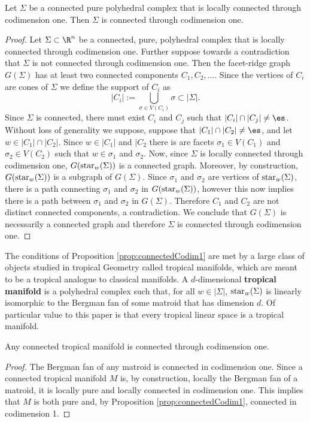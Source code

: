 \begin{proposition}\label{prop:connectedCodim1}
Let $\Sigma$ be a connected pure polyhedral complex that is locally connected through codimension one. Then $\Sigma$ is connected through codimension one.
\end{proposition}
\begin{proof}
    Let $\Sigma\subset \R^n$ be a connected, pure, polyhedral complex that is locally connected through codimension one. Further suppose towards a contradiction that $\Sigma$ is not connected through codimension one. Then the facet-ridge graph $G(\Sigma)$ has at least two connected components $C_1, C_2,\dots$. Since the vertices of $C_i$ are cones of $\Sigma$ we define the support of $C_i$ as
    $$|C_i|:= \bigcup_{\sigma\in V(C_i)} \sigma\subset |\Sigma|.$$
    Since $\Sigma$ is connected, there must exist $C_i$ and $C_j$ such that $|C_i|\cap |C_j|\neq \es$. Without loss of generality we suppose, suppose that $|C_1|\cap |C_2|\neq \es$, and let $w\in |C_1|\cap |C_2|$. Since $w\in |C_1|$ and $|C_2$ there is are facets  $\sigma_1\in V(C_1)$ and $\sigma_2\in V(C_2)$ such that $w\in \sigma_1$ and $\sigma_2$. Now, since $\Sigma$ is locally connected through codimension one, $G(\operatorname{star}_w(\Sigma))$ is a connected graph. Moreover, by construction, $G(\operatorname{star}_w(\Sigma))$ is a subgraph of $G(\Sigma)$. Since $\sigma_1$ and $\sigma_2$ are vertices of $\operatorname{star}_w(\Sigma)$, there is a path connecting $\sigma_1$ and $\sigma_2$ in $G(\operatorname{star}_w(\Sigma))$, however this now implies there is a path between $\sigma_1$ and $\sigma_2$ in $G(\Sigma)$. Therefore $C_1$ and $C_2$ are not distinct connected components, a contradiction. We conclude that $G(\Sigma)$ is necessarily a connected graph and therefore $\Sigma$ is connected through codimension one.
\end{proof}

The conditions of Proposition \ref{prop:connectedCodim1} are met by a large class of objects studied in tropical Geometry called tropical manifolds, which are meant to be a tropical analogue to classical manifolds. A $d$-dimensional \textbf{tropical manifold} is a polyhedral complex such that, for all $w\in |\Sigma|$, $\operatorname{star}_w(\Sigma)$ is linearly isomorphic to the Bergman fan of some matroid that has dimension $d$. Of particular value to this paper is that every tropical linear space is a tropical manifold.

\begin{corollary}\label{cor:connectedCodim1}
    Any connected tropical manifold is connected through codimension one.
\end{corollary}
\begin{proof}
    The Bergman fan of any matroid is connected in codimension one. Since a connected tropical manifold $M$ is, by construction, locally the Bergman fan of a matroid, it is locally pure and locally connected in codimension one. This implies that $M$ is both pure and, by Proposition \ref{prop:connectedCodim1}, connected in codimension 1.
\end{proof}

